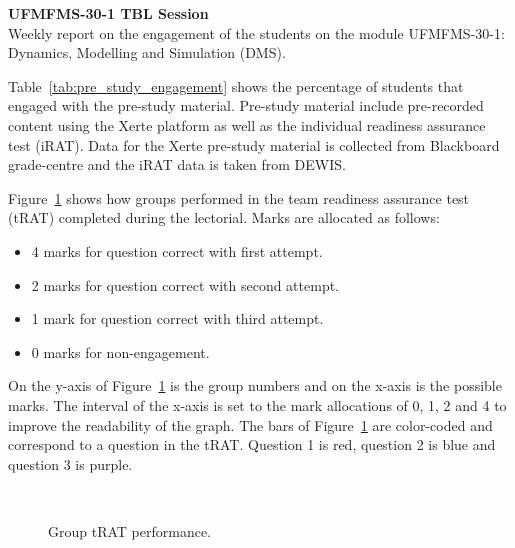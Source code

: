 \documentclass[14pt,english, margin=1cm]{article}
\newcommand{\VAR}[1]{}
\begin{document}
\noindent \textbf{UFMFMS-30-1 TBL Session \VAR{session}}\\

\noindent Weekly report on the engagement of the students on the module UFMFMS-30-1: Dynamics, Modelling and Simulation (DMS).  

\noindent Table~\ref{tab:pre_study_engagement} shows the percentage of students that engaged with the pre-study material. 
Pre-study material include pre-recorded content using the Xerte platform as well as the individual readiness assurance test (iRAT).
Data for the Xerte pre-study material is collected from Blackboard grade-centre and the iRAT data is taken from DEWIS.


\noindent Figure~\ref{fig:trat_performance} shows how groups performed in the team readiness assurance test (tRAT) completed during the lectorial.
Marks are allocated as follows:
\begin{itemize}
\setlength\itemsep{0.1em}
\item 4 marks for question correct with first attempt.
\item 2 marks for question correct with second attempt.
\item 1 mark for question correct with third attempt.
\item 0 marks for non-engagement.
\end{itemize}
On the y-axis of Figure~\ref{fig:trat_performance} is the group numbers and on the x-axis is the possible marks.
The interval of the x-axis is set to the mark allocations of 0, 1, 2 and 4 to improve the readability of the graph.
The bars of Figure~\ref{fig:trat_performance} are color-coded and correspond to a question in the tRAT.
Question 1 is red, question 2 is blue and question 3 is purple.

\begin{figure}[tbh!]
	\centering
	 \hfill 
	\\
	\caption{Group tRAT performance.}
	\label{fig:trat_performance}
\end{figure}
\end{document}
